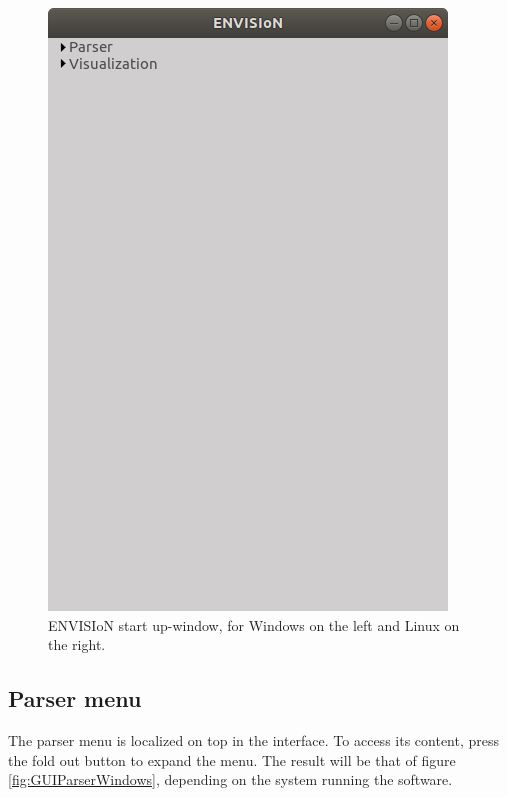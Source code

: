 \begin{figure}[ht]
    \includegraphics[angle=0,scale=0.49]{images/GUIBasLinux.png}
    \caption{ENVISIoN start up-window, for Windows on the left and Linux on the right.}
    \label{fig:GUIStartup}
\end{figure}

\subsection{Parser menu}
The parser menu is localized on top in the interface. To access its content, press the fold out button to expand the menu. The result will be that of figure \ref{fig:GUIParserWindows}, depending on the system running the software. 


